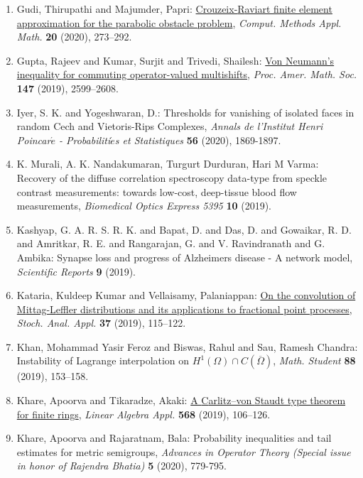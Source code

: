 \begin{enumerate}[resume, leftmargin=27pt]
	\item Gudi, Thirupathi and Majumder, Papri: \href{https://doi.org/10.1515/cmam-2019-0057}{Crouzeix-{R}aviart finite element approximation for the
	      parabolic obstacle problem}, \emph{Comput. Methods Appl. Math.} {\bf 20} (2020), 273--292.

	\item Gupta, Rajeev and Kumar, Surjit and Trivedi, Shailesh: \href{https://doi.org/10.1090/proc/14410}{Von {N}eumann's inequality for commuting operator-valued
		      multishifts}, \emph{Proc. Amer. Math. Soc.} {\bf 147} (2019), 2599--2608.

	\item Iyer, S. K. and Yogeshwaran, D.: Thresholds for vanishing of isolated faces in random Cech and Vietoris-Rips Complexes, \emph{Annals de l'Institut Henri Poincar$\acute{e}$ - Probabiliti$\acute{e}$s et Statistiques} {\bf 56} (2020), 1869-1897.

	\item K. Murali, A. K. Nandakumaran, Turgurt Durduran, Hari M Varma: Recovery of the diffuse correlation spectroscopy data-type from speckle contrast measurements: towards low-cost, deep-tissue blood flow measurements, \emph{Biomedical Optics Express 5395} {\bf 10} (2019).

	\item Kashyap, G. A. R. S. R. K. and Bapat, D. and Das, D. and Gowaikar, R. D. and  Amritkar, R. E. and Rangarajan, G. and V. Ravindranath and G. Ambika: Synapse loss and progress of Alzheimers disease - A network model, \emph{Scientific Reports} {\bf 9} (2019).

	\item Kataria, Kuldeep Kumar and Vellaisamy, Palaniappan: \href{https://doi.org/10.1080/07362994.2018.1538803}{On the convolution of {M}ittag-{L}effler distributions and its
	      applications to fractional point processes}, \emph{Stoch. Anal. Appl.} {\bf 37} (2019), 115--122.

	\item Khan, Mohammad Yasir Feroz and Biswas, Rahul and Sau, Ramesh
	      Chandra: Instability of {L}agrange interpolation on {$H^1(\Omega)\cap
				      C(\overline\Omega)$}, \emph{Math. Student} {\bf 88} (2019), 153--158.

	\item Khare, Apoorva and Tikaradze, Akaki: \href{https://doi.org/10.1016/j.laa.2018.05.035}{A {C}arlitz--von {S}taudt type theorem for finite rings}, \emph{Linear Algebra Appl.} {\bf 568} (2019), 106--126.
	\item Khare, Apoorva and Rajaratnam, Bala: Probability inequalities and tail estimates for metric semigroups, \emph{Advances in Operator Theory (Special issue in honor of Rajendra Bhatia)} {\bf 5} (2020), 779-795.


\end{enumerate}
